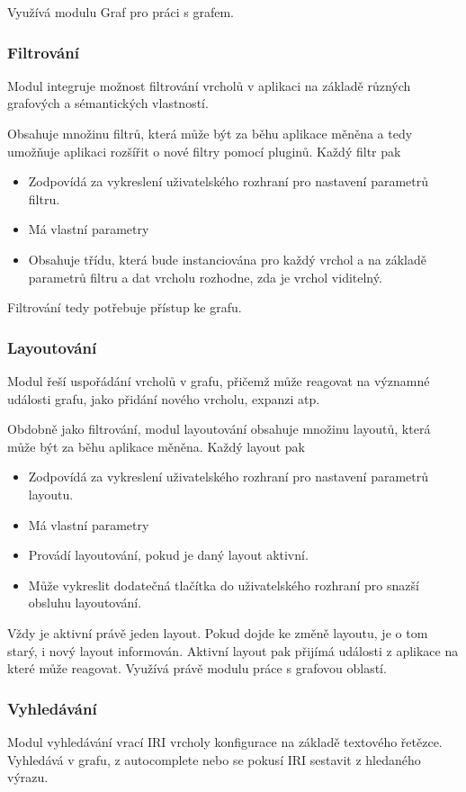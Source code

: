Využívá modulu Graf pro práci s grafem.

\subsubsection{Filtrování}
Modul integruje možnost filtrování vrcholů v aplikaci na základě různých grafových a sémantických vlastností.

Obsahuje množinu filtrů, která může být za běhu aplikace měněna a tedy umožňuje aplikaci rozšířit o nové filtry pomocí pluginů. Každý filtr pak
\begin{itemize}
    \item Zodpovídá za vykreslení uživatelského rozhraní pro nastavení parametrů filtru.
    \item Má vlastní parametry
    \item Obsahuje třídu, která bude instanciována pro každý vrchol a na základě parametrů filtru a dat vrcholu rozhodne, zda je vrchol viditelný.
\end{itemize}

Filtrování tedy potřebuje přístup ke grafu.

\subsubsection{Layoutování}
Modul řeší uspořádání vrcholů v grafu, přičemž může reagovat na významné události grafu, jako přidání nového vrcholu, expanzi atp.

Obdobně jako filtrování, modul layoutování obsahuje množinu layoutů, která může být za běhu aplikace měněna. Každý layout pak
\begin{itemize}
    \item Zodpovídá za vykreslení uživatelského rozhraní pro nastavení parametrů layoutu.
    \item Má vlastní parametry
    \item Provádí layoutování, pokud je daný layout aktivní.
    \item Může vykreslit dodatečná tlačítka do uživatelského rozhraní pro snazší obsluhu layoutování.
\end{itemize}

Vždy je aktivní právě jeden layout. Pokud dojde ke změně layoutu, je o tom starý, i nový layout informován. Aktivní layout pak přijímá události z aplikace na které může reagovat. Využívá právě modulu práce s grafovou oblastí.

\subsubsection{Vyhledávání}
Modul vyhledávání vrací IRI vrcholy konfigurace na základě textového řetězce. Vyhledává v grafu, z autocomplete nebo se pokusí IRI sestavit z hledaného výrazu.

